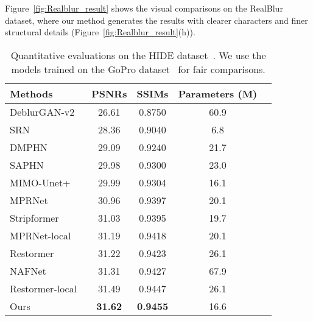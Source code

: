 \documentclass[10pt,twocolumn,letterpaper]{article}
\begin{document}
Figure~\ref{fig:Realblur_result} shows the visual comparisons on the RealBlur dataset, where our method generates the results with clearer characters and finer structural details (Figure~\ref{fig:Realblur_result}(h)).

\begin{table}[!t]\footnotesize
\centering
    \caption{Quantitative evaluations on the HIDE dataset~\cite{HIDE}. We use the models trained on the GoPro dataset~\cite{GoPro}
    for fair comparisons.}
    \vspace{-2mm}
    \label{tab:HIDE}
    \begin{tabular}{lcccc}
        \toprule
       Methods                         & PSNRs & SSIMs & Parameters (M) & \\
        \midrule
        DeblurGAN-v2\cite{DeblurGANv2} & 26.61 & 0.8750 &  60.9 \\
        SRN~\cite{SRN}                  & 28.36 & 0.9040 &  6.8  \\
        DMPHN~\cite{DMPHN}              & 29.09 & 0.9240 &  21.7 \\
        SAPHN~\cite{SAPHN}              & 29.98 & 0.9300 &  23.0 \\
        MIMO-Unet+~\cite{MIMO}          & 29.99 & 0.9304 &  16.1 \\
        MPRNet~\cite{MPRNet}            & 30.96 & 0.9397 &  20.1 \\
        Stripformer~\cite{Stripformer} & 31.03 & 0.9395 &  19.7 \\
        MPRNet-local~\cite{TLC}        & 31.19 & 0.9418 &  20.1 \\
        Restormer~\cite{Restormer}      & 31.22 & 0.9423 &  26.1 \\
        NAFNet\cite{NAFNet}           & 31.31  & 0.9427 &  67.9 \\
        Restormer-local~\cite{TLC}     & 31.49 & 0.9447 &  26.1 \\
        Ours                           & \textbf{31.62} & \textbf{0.9455} & 16.6\\
        \bottomrule
    \end{tabular}
    \vspace{-5mm}
\end{table}
\end{document}
